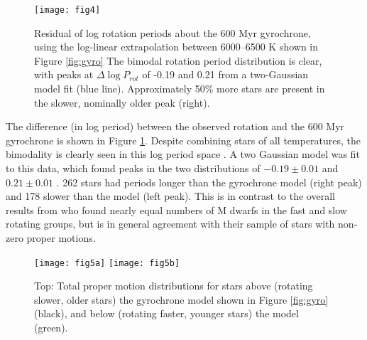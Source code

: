 \documentclass[manuscript, letterpaper]{aastex6}
\begin{document}
\begin{figure}[]
\centering
\texttt{[image: fig4]}
\caption{Residual of log rotation periods about the \citet{meibom2011} 600 Myr gyrochrone, using the log-linear extrapolation between 6000--6500 K shown in Figure \ref{fig:gyro}   The bimodal rotation period distribution  is clear, with peaks at $\Delta \log P_{rot}$ of -0.19 and 0.21  from a two-Gaussian model fit (blue line). 
Approximately 50\% more stars are present in the slower, nominally older peak (right).
}
\label{fig:diff}
\end{figure}


The difference (in log period) between the observed rotation and the 600 Myr gyrochrone  is shown in Figure \ref{fig:diff}. Despite combining stars of all temperatures, the bimodality is clearly seen in this log period space . A two Gaussian model was fit to this data, which found peaks in the two distributions of $-0.19 \pm 0.01$ and $0.21 \pm 0.01$ .  262 stars had periods longer than the gyrochrone model (right peak) and 178 slower than the model (left peak). This is in contrast to the overall results from \citet{mcquillan2013} who found nearly equal numbers of M dwarfs in the fast and slow rotating groups, but is in general agreement with their sample of stars with non-zero proper motions. 



\begin{figure}[]
\centering
\texttt{[image: fig5a]}
\texttt{[image: fig5b]}
\caption{Top: Total proper motion distributions for stars above (rotating slower, older stars) the gyrochrone model shown in Figure \ref{fig:gyro} (black), and below (rotating faster, younger stars) the model (green). 
}
\label{fig:pm}
\end{figure}
\end{document}
